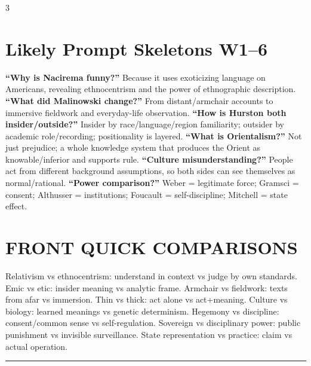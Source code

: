\documentclass[10pt,landscape]{article}
\newcommand{\kw}[1]{\textbf{#1}}
\newcommand{\sep}{\vspace{0.8pt}\hrule\vspace{0.8pt}}
\begin{document}
\begin{multicols}{3}
\section*{Likely Prompt Skeletons W1--6}
\kw{``Why is Nacirema funny?''} Because it uses exoticizing language on Americans, revealing ethnocentrism and the power of ethnographic description. \kw{``What did Malinowski change?''} From distant/armchair accounts to immersive fieldwork and everyday-life observation. \kw{``How is Hurston both insider/outside?''} Insider by race/language/region familiarity; outsider by academic role/recording; positionality is layered. \kw{``What is Orientalism?''} Not just prejudice; a whole knowledge system that produces the Orient as knowable/inferior and supports rule. \kw{``Culture misunderstanding?''} People act from different background assumptions, so both sides can see themselves as normal/rational. \kw{``Power comparison?''} Weber = legitimate force; Gramsci = consent; Althusser = institutions; Foucault = self-discipline; Mitchell = state effect.

\section*{FRONT QUICK COMPARISONS}
Relativism vs ethnocentrism: understand in context vs judge by own standards. Emic vs etic: insider meaning vs analytic frame. Armchair vs fieldwork: texts from afar vs immersion. Thin vs thick: act alone vs act+meaning. Culture vs biology: learned meanings vs genetic determinism. Hegemony vs discipline: consent/common sense vs self-regulation. Sovereign vs disciplinary power: public punishment vs invisible surveillance. State representation vs practice: claim vs actual operation.


\sep

\end{multicols}
\end{document}
